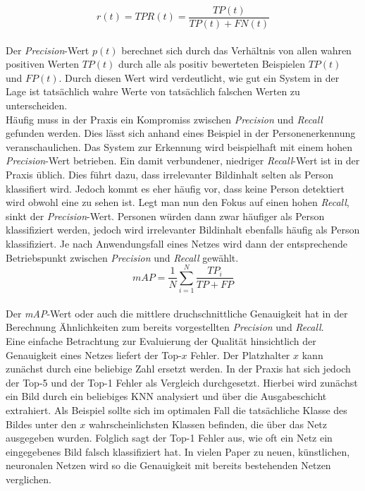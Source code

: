 		\begin{equation}
		r(t)=TPR(t)=\frac{TP(t)}{TP(t)+FN(t)}
		\label{eq: recall}
		\end{equation}\\
		
		Der \textit{Precision}-Wert $p(t)$ berechnet sich durch das Verhältnis von allen wahren positiven Werten $TP(t)$ durch alle als positiv bewerteten Beispielen $TP(t)$ und $FP(t)$. Durch diesen Wert wird verdeutlicht, wie gut ein System in der Lage ist tatsächlich wahre Werte von tatsächlich falschen Werten zu unterscheiden.\\
		
		
		Häufig muss in der Praxis ein Kompromiss zwischen \textit{Precision} und \textit{Recall} gefunden werden. Dies lässt sich anhand eines Beispiel in der Personenerkennung veranschaulichen. Das System zur Erkennung wird beispielhaft mit einem hohen \textit{Precision}-Wert betrieben. Ein damit verbundener, niedriger \textit{Recall}-Wert ist in der Praxis üblich. Dies führt dazu, dass irrelevanter Bildinhalt selten als Person klassifiert wird. Jedoch kommt es eher häufig vor, dass keine Person detektiert wird obwohl eine zu sehen ist. Legt man nun den Fokus auf einen hohen \textit{Recall}, sinkt der \textit{Precision}-Wert. Personen würden dann zwar häufiger als Person klassifiziert werden, jedoch wird irrelevanter Bildinhalt ebenfalls häufig als Person klassifiziert. Je nach Anwendungsfall eines Netzes wird dann der entsprechende Betriebspunkt zwischen \textit{Precision} und \textit{Recall} gewählt.\\
		
		\begin{equation}
		mAP = \frac{1}{N}\sum_{i=1}^{N}\frac{TP_i}{TP+FP}
		\end{equation}\\
		
		Der \textit{mAP}-Wert oder auch die mittlere druchschnittliche Genauigkeit hat in der Berechnung Ähnlichkeiten zum bereits vorgestellten \textit{Precision} und \textit{Recall}. \\
		
		Eine einfache Betrachtung zur Evaluierung der Qualität hinsichtlich der Genauigkeit eines Netzes liefert der Top-$x$ Fehler. Der Platzhalter $x$ kann zunächst durch eine beliebige Zahl ersetzt werden. In der Praxis hat sich jedoch der Top-5 und der Top-1 Fehler als Vergleich durchgesetzt. Hierbei wird zunächst ein Bild durch ein beliebiges KNN analysiert und über die Ausgabeschicht extrahiert. Als Beispiel sollte sich im optimalen Fall die tatsächliche Klasse des Bildes unter den $x$ wahrscheinlichsten Klassen befinden, die über das Netz ausgegeben wurden. Folglich sagt der Top-1 Fehler aus, wie oft ein Netz ein eingegebenes Bild falsch klassifiziert hat. In vielen Paper zu neuen, künstlichen, neuronalen Netzen wird so die Genauigkeit mit bereits bestehenden Netzen verglichen.
		
